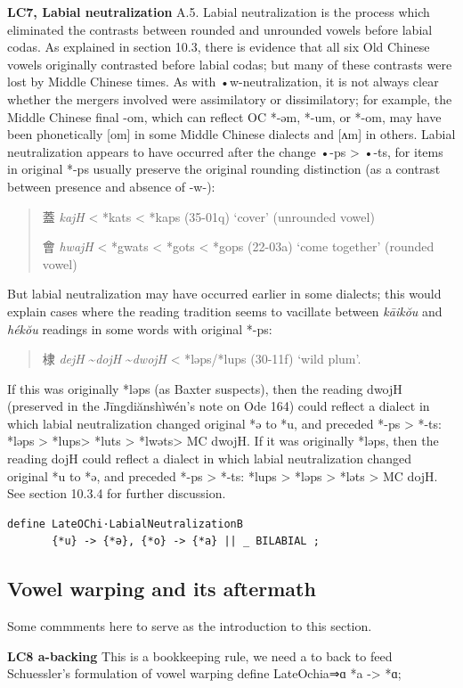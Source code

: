 \documentclass[xetex, svgnames, 12pt]{scrartcl}
\newcounter{para}
\newcommand\mypara[1]{\par\refstepcounter{para}\textbf{\thepara\space#1\space}}
\begin{document}
\mypara{LC7, Labial neutralization}
A.5. 
 Labial neutralization is the process which eliminated the contrasts 
 between rounded and unrounded vowels before labial codas. 
 As explained in section 10.3, there is evidence that
 all six Old Chinese vowels originally contrasted before labial codas; 
 but many of these contrasts were lost by Middle Chinese times. 
 As with •w-neutralization, it is not always clear whether the mergers 
 involved were assimilatory or dissimilatory; for example, the
 Middle Chinese final -om, which can reflect OC *-əm, *-um, or *-om, 
 may have been phonetically [om] in some Middle Chinese dialects and [ʌm] 
 in others. Labial neutralization appears to have occurred after the 
 change •-ps > •-ts, for items in original *-ps usually preserve the 
 original rounding distinction (as a contrast between presence and 
 absence of -w-):
\begin{quote}
蓋 %
\textit{kajH} < *kats < *kaps (35-01q) `cover' (unrounded vowel)

會 %
\textit{hwajH} < *gwats < *gots < *gops (22-03a) `come together' (rounded vowel)
\end{quote}
 But labial neutralization may have occurred earlier in some dialects; 
 this would explain cases where the reading tradition seems to vacillate 
 between \textit{kāikŏu} and \textit{hékŏu} readings in some words with original *-ps:
 \begin{quote}
棣 %
\textit{dejH} \textasciitilde  \textit{dojH} \textasciitilde \textit{dwojH} < *ləps/*lups (30-11f) `wild plum'.
 \end{quote}
If this was originally *ləps (as Baxter suspects), then the reading dwojH 
(preserved in the Jīngdiănshìwén's note on Ode 164) could reflect a dialect in which labial neutralization changed 
original *ə to *u, and preceded *-ps > *-ts: *ləps > *lups> *luts > *lwəts> MC dwojH. If
it was originally *ləps, then the reading dojH could  reflect a dialect in which labial neutralization
 changed original *u to *ə, and preceded *-ps > *-ts: *lups > *ləps > *ləts > MC
 dojH. See section 10.3.4 for further discussion.
 \begin{verbatim}
define LateOChi·LabialNeutralizationB 
       {*u} -> {*ə}, {*o} -> {*a} || _ BILABIAL ;
 \end{verbatim}

\subsection{Vowel warping and its aftermath}
Some commments here to serve as the introduction to this section. 
\mypara{LC8 a-backing}
This is a bookkeeping rule, we need a to back to feed Schuessler's formulation of vowel warping
define LateOchia⇒ɑ {*a} -> {*ɑ};
\end{document}
